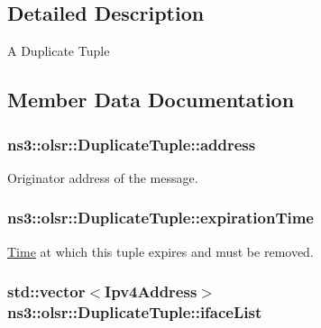 \subsection{Detailed Description}
A Duplicate Tuple 

\subsection{Member Data Documentation}
\subsubsection[{\texorpdfstring{address}{address}}]{ ns3\+::olsr\+::\+Duplicate\+Tuple\+::address}\hypertarget{structns3_1_1olsr_1_1DuplicateTuple_a3e13889658808580ccdf5b4eb930f4ab}{}\label{structns3_1_1olsr_1_1DuplicateTuple_a3e13889658808580ccdf5b4eb930f4ab}


Originator address of the message. 

\subsubsection[{\texorpdfstring{expiration\+Time}{expirationTime}}]{ ns3\+::olsr\+::\+Duplicate\+Tuple\+::expiration\+Time}\hypertarget{structns3_1_1olsr_1_1DuplicateTuple_af4b2054d69cf16961b37d482214c0a0e}{}\label{structns3_1_1olsr_1_1DuplicateTuple_af4b2054d69cf16961b37d482214c0a0e}


\hyperlink{classns3_1_1Time}{Time} at which this tuple expires and must be removed. 

\subsubsection[{\texorpdfstring{iface\+List}{ifaceList}}]{\setlength{\rightskip}{0pt plus 5cm}std\+::vector$<${\bf Ipv4\+Address}$>$ ns3\+::olsr\+::\+Duplicate\+Tuple\+::iface\+List}\hypertarget{structns3_1_1olsr_1_1DuplicateTuple_a3649a1e89ec9b976cc4c74d1ebb7c9b1}{}\label{structns3_1_1olsr_1_1DuplicateTuple_a3649a1e89ec9b976cc4c74d1ebb7c9b1}


